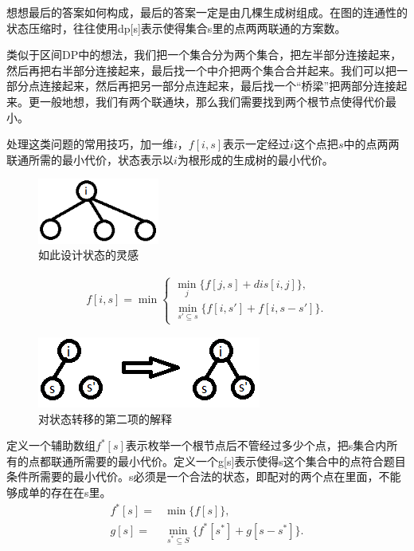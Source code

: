 想想最后的答案如何构成，最后的答案一定是由几棵生成树组成。在图的连通性的状态压缩时，往往使用dp[s]表示使得集合s里的点两两联通的方案数。

类似于区间DP中的想法，我们把一个集合分为两个集合，把左半部分连接起来，然后再把右半部分连接起来，最后找一个中介把两个集合合并起来。我们可以把一部分点连接起来，然后再把另一部分点连起来，最后找一个“桥梁”把两部分连接起来。更一般地想，我们有两个联通块，那么我们需要找到两个根节点使得代价最小。

处理这类问题的常用技巧，加一维$i$，$f[i,s]$表示一定经过$i$这个点把$s$中的点两两联通所需的最小代价，状态表示以$i$为根形成的生成树的最小代价。
\begin{figure}[h]
    \begin{center}
        \includegraphics[width=4cm]{idea.png}
    \end{center}
    \caption{如此设计状态的灵感}
    \label{fig. 1.3}
\end{figure}
\begin{equation*}
    \begin{aligned}
        f[i,s]=\min
        \begin{cases}
            \min\limits_{j}\{f[j,s]+dis[i,j]\},\\
            \min\limits_{s'\subseteq s}\{f[i,s']+f[i,s-s']\}.
        \end{cases}
    \end{aligned}
\end{equation*}
\begin{figure}
    \begin{center}
        \includegraphics{to.png}
    \end{center}
    \caption{对状态转移的第二项的解释}
    \label{fig. 1.4}
\end{figure}

定义一个辅助数组$f^*[s]$表示枚举一个根节点后不管经过多少个点，把s集合内所有的点都联通所需要的最小代价。定义一个g[s]表示使得s这个集合中的点符合题目条件所需要的最小代价。s必须是一个合法的状态，即配对的两个点在里面，不能够成单的存在在s里。
\begin{equation*}
    \begin{aligned}
        f^*[s]=&\min\{f[s]\},\\
        g[s]=&\min\limits_{s^*\subseteq S}\{f^*[s^*]+g[s-s^*]\}.
    \end{aligned}
\end{equation*}
